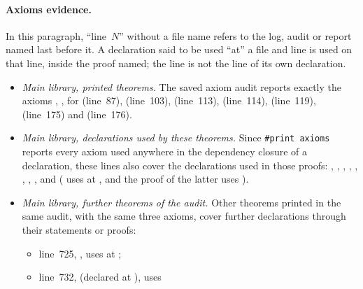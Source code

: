 \paragraph{Axioms evidence.}
{\raggedright
In this paragraph, ``line~$N$'' without a file name refers to the log, audit or report named last
before it.
A declaration said to be used ``at'' a file and line is used on that line, inside the proof named; the
line is not the line of its own declaration.
\begin{itemize}
\item \emph{Main library, printed theorems.} The saved axiom audit
   reports exactly the axioms ,
  ,  for 
  (line~87),  (line~103),
   (line~113),
   (line~114),
   (line~119),
   (line~175) and
   (line~176).
\item \emph{Main library, declarations used by these theorems.} Since \texttt{\#print axioms} reports every
  axiom used anywhere in the dependency closure of a declaration, these lines also cover the declarations
  used in those proofs: , ,
  , , ,
  , , ,
   and 
  ( uses  at
  , and the proof of the latter uses
  ).
\item \emph{Main library, further theorems of the audit.} Other theorems printed in the same audit, with
  the same three axioms, cover further declarations through their statements or proofs:
  \begin{itemize}
  \item line~725, , uses  at
    ;
  \item line~732,  (declared at ), uses

\end{itemize}
\end{itemize}}
